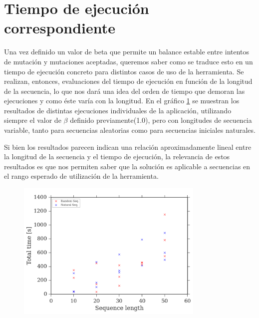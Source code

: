 \section{Tiempo de ejecución correspondiente}

Una vez definido un valor de beta que permite un balance estable entre intentos de mutación y mutaciones aceptadas, queremos saber como se traduce esto en un tiempo de ejecución concreto para distintos casos de uso de la herramienta.
Se realizan, entonces, evaluaciones del tiempo de ejecución en función de la longitud de la secuencia, lo que nos dará una idea del orden de tiempo que demoran las ejecuciones y como éste varía con la longitud.
En el gráfico \ref{fig:time-vs-length} se muestran los resultados de distintas ejecuciones individuales de la aplicación, utilizando siempre el valor de $\beta$ definido previamente(1.0), pero con longitudes de secuencia variable, 
tanto para secuencias aleatorias como para secuencias iniciales naturales.

Si bien los resultados parecen indican una relación aproximadamente lineal entre la longitud de la secuencia y el tiempo de ejecución, la relevancia de estos resultados es que nos permiten 
saber que la solución es aplicable a secuencias en el rango esperado de utilización de la herramienta. 

\begin{figure}[htbp]
\centering
\includegraphics[width=0.8\textwidth]{img/resultados/time-vs-length-beta1.png}
\caption{}
\label{fig:time-vs-length}
\end{figure}





